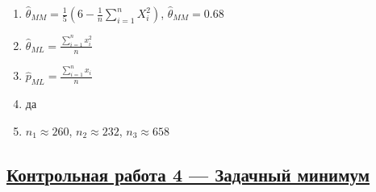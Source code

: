 \begin{multicols}{2}
\begin{enumerate}
\item $\hat{\theta}_{MM} = \frac{1}{5}\left(6 - \frac{1}{n}\sum_{i=1}^n X_i^2 \right)$, $\hat{\theta}_{MM} = 0.68$
\item $\hat{\theta}_{ML} = \frac{\sum_{i=1}^n x_i^2}{n}$
\item $\hat{p}_{ML} = \frac{\sum_{i=1}^n x_i}{n}$
\item да
\item $n_1 \approx 260$, $n_2 \approx 232$, $n_3 \approx 658$

\end{enumerate}
\end{multicols}






\subsection[Кр 4]{\hyperref[sec:minimum_kr_04]{Контрольная работа 4 — Задачный минимум}}
\label{sec:sol_minimum_kr_04}


